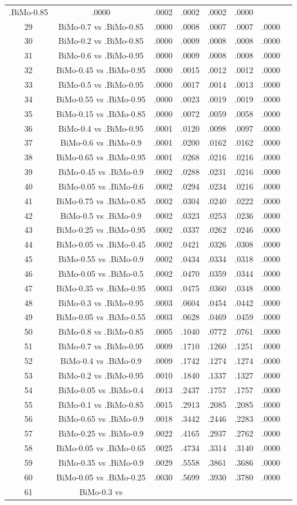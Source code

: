 \documentclass[a4paper,10pt]{article}
\begin{document}
\begin{landscape}
\begin{table}[!htp]
\begin{tabular}{cccccccc}
.BiMo-0.85&.0000&.0002&.0002&.0002&.0000\\29&BiMo-0.7 vs .BiMo-0.85&.0000&.0008&.0007&.0007&.0000\\30&BiMo-0.2 vs .BiMo-0.85&.0000&.0009&.0008&.0008&.0000\\31&BiMo-0.6 vs .BiMo-0.95&.0000&.0009&.0008&.0008&.0000\\32&BiMo-0.45 vs .BiMo-0.95&.0000&.0015&.0012&.0012&.0000\\33&BiMo-0.5 vs .BiMo-0.95&.0000&.0017&.0014&.0013&.0000\\34&BiMo-0.55 vs .BiMo-0.95&.0000&.0023&.0019&.0019&.0000\\35&BiMo-0.15 vs .BiMo-0.85&.0000&.0072&.0059&.0058&.0000\\36&BiMo-0.4 vs .BiMo-0.95&.0001&.0120&.0098&.0097&.0000\\37&BiMo-0.6 vs .BiMo-0.9&.0001&.0200&.0162&.0162&.0000\\38&BiMo-0.65 vs .BiMo-0.95&.0001&.0268&.0216&.0216&.0000\\39&BiMo-0.45 vs .BiMo-0.9&.0002&.0288&.0231&.0216&.0000\\40&BiMo-0.05 vs .BiMo-0.6&.0002&.0294&.0234&.0216&.0000\\41&BiMo-0.75 vs .BiMo-0.85&.0002&.0304&.0240&.0222&.0000\\42&BiMo-0.5 vs .BiMo-0.9&.0002&.0323&.0253&.0236&.0000\\43&BiMo-0.25 vs .BiMo-0.95&.0002&.0337&.0262&.0246&.0000\\44&BiMo-0.05 vs .BiMo-0.45&.0002&.0421&.0326&.0308&.0000\\45&BiMo-0.55 vs .BiMo-0.9&.0002&.0434&.0334&.0318&.0000\\46&BiMo-0.05 vs .BiMo-0.5&.0002&.0470&.0359&.0344&.0000\\47&BiMo-0.35 vs .BiMo-0.95&.0003&.0475&.0360&.0348&.0000\\48&BiMo-0.3 vs .BiMo-0.95&.0003&.0604&.0454&.0442&.0000\\49&BiMo-0.05 vs .BiMo-0.55&.0003&.0628&.0469&.0459&.0000\\50&BiMo-0.8 vs .BiMo-0.85&.0005&.1040&.0772&.0761&.0000\\51&BiMo-0.7 vs .BiMo-0.95&.0009&.1710&.1260&.1251&.0000\\52&BiMo-0.4 vs .BiMo-0.9&.0009&.1742&.1274&.1274&.0000\\53&BiMo-0.2 vs .BiMo-0.95&.0010&.1840&.1337&.1327&.0000\\54&BiMo-0.05 vs .BiMo-0.4&.0013&.2437&.1757&.1757&.0000\\55&BiMo-0.1 vs .BiMo-0.85&.0015&.2913&.2085&.2085&.0000\\56&BiMo-0.65 vs .BiMo-0.9&.0018&.3442&.2446&.2283&.0000\\57&BiMo-0.25 vs .BiMo-0.9&.0022&.4165&.2937&.2762&.0000\\58&BiMo-0.05 vs .BiMo-0.65&.0025&.4734&.3314&.3140&.0000\\59&BiMo-0.35 vs .BiMo-0.9&.0029&.5558&.3861&.3686&.0000\\60&BiMo-0.05 vs .BiMo-0.25&.0030&.5699&.3930&.3780&.0000\\61&BiMo-0.3 vs 
\end{tabular}
\end{table}
\end{landscape}
\end{document}
